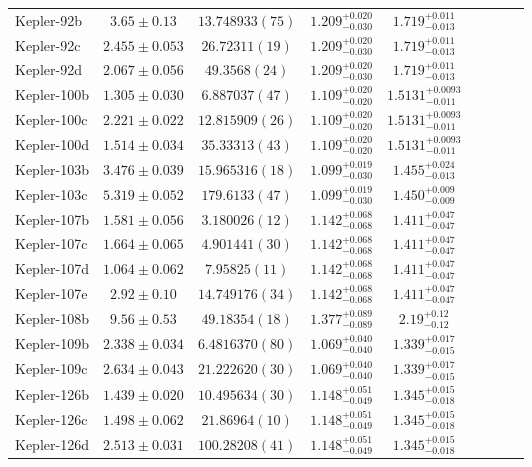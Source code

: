 \documentclass[a4paper,fleqn,usenatbib]{mnras}
\begin{document}
\begin{table*}
\begin{tabular}{lcccccccc}
Kepler-92b& 	$3.65 \pm 0.13$	   &$13.748933 (75)$	&$1.209_{-0.030}^{+0.020}$	&$1.719_{-0.013}^{+0.011}$		\\
Kepler-92c& 	$2.455 \pm 0.053$	&$26.72311 (19)$	&$1.209_{-0.030}^{+0.020}$	&$1.719_{-0.013}^{+0.011}$		\\
Kepler-92d& 	$2.067 \pm 0.056$	&$49.3568 (24)$		&$1.209_{-0.030}^{+0.020}$	&$1.719_{-0.013}^{+0.011}$		\\
Kepler-100b&	$1.305 \pm 0.030$	&$6.887037 (47)$	&$1.109_{-0.020}^{+0.020}$	&$1.5131_{-0.011}^{+0.0093}$		\\
Kepler-100c&	$2.221 \pm 0.022$	&$12.815909 (26)$	&$1.109_{-0.020}^{+0.020}$	&$1.5131_{-0.011}^{+0.0093}$		\\
Kepler-100d&	$1.514 \pm 0.034$	&$35.33313 (43)$	&$1.109_{-0.020}^{+0.020}$	&$1.5131_{-0.011}^{+0.0093}$	\\
Kepler-103b&	$3.476 \pm 0.039$	&$15.965316 (18)$	&$1.099_{-0.030}^{+0.019}$	&$1.455_{-0.013}^{+0.024}$		\\
Kepler-103c&	$5.319 \pm 0.052$	&$179.6133 (47)$	&$1.099_{-0.030}^{+0.019}$	&$1.450_{-0.009}^{+0.009}$		\\
Kepler-107b&	$1.581 \pm 0.056$	&$3.180026 (12)$	&$1.142_{-0.068}^{+0.068}$	&$1.411_{-0.047}^{+0.047}$\\
Kepler-107c&	$1.664 \pm 0.065$	&$4.901441 (30)$	&$1.142_{-0.068}^{+0.068}$	&$1.411_{-0.047}^{+0.047}$\\
Kepler-107d&	$1.064 \pm 0.062$	&$7.95825 (11)$		&$1.142_{-0.068}^{+0.068}$	&$1.411_{-0.047}^{+0.047}$	\\
Kepler-107e&	$2.92 \pm 0.10$	   &$14.749176 (34)$	&$1.142_{-0.068}^{+0.068}$	&$1.411_{-0.047}^{+0.047}$	\\
Kepler-108b&	$9.56 \pm 0.53$	   &$49.18354 (18)$	    &$1.377_{-0.089}^{+0.089}$	&$2.19_{-0.12}^{+0.12}$		\\
Kepler-109b&	$2.338 \pm 0.034$	&$6.4816370 (80)$	&$1.069_{-0.040}^{+0.040}$	&$1.339_{-0.015}^{+0.017}$		\\
Kepler-109c&	$2.634 \pm 0.043$	&$21.222620 (30)$	&$1.069_{-0.040}^{+0.040}$	&$1.339_{-0.015}^{+0.017}$		\\
Kepler-126b&	$1.439 \pm 0.020$	&$10.495634 (30)$	&$1.148_{-0.049}^{+0.051}$	&$1.345_{-0.018}^{+0.015}$	\\
Kepler-126c&	$1.498 \pm 0.062$	&$21.86964 (10)$	&$1.148_{-0.049}^{+0.051}$	&$1.345_{-0.018}^{+0.015}$	\\
Kepler-126d&	$2.513 \pm 0.031$	&$100.28208 (41)$	&$1.148_{-0.049}^{+0.051}$	&$1.345_{-0.018}^{+0.015}$	\\

\end{tabular}
\end{table*}
\end{document}
